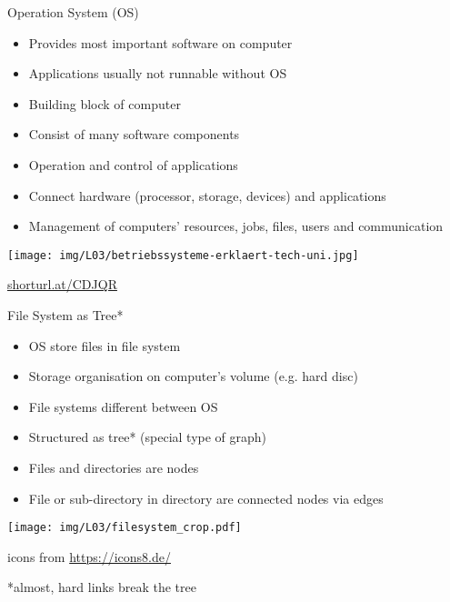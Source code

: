 \documentclass[hyperref={pdfpagelabels=false},aspectratio=169]{beamer}
\begin{document}
\begin{frame}{Operation System (OS)}
    
    \begin{itemize}
        \item Provides most important software on computer
        \item Applications usually not runnable without OS
        \item Building block of computer
        \item Consist of many software components
        \item Operation and control of applications
        \item Connect hardware (processor, storage, devices) and applications 
        \item Management of computers' resources, jobs, files, users and communication
    \end{itemize}
    
    \vspace{10pt}
    \centering
    \texttt{[image: img/L03/betriebssysteme-erklaert-tech-uni.jpg]}
    
    \tiny \url{shorturl.at/CDJQR}
    
\end{frame}

\begin{frame}{File System as Tree*}
    
    \begin{minipage}{0.59\textwidth}
        \begin{itemize}
            \item OS store files in file system
            \item Storage organisation on computer's volume (e.g. hard disc)
            \item File systems different between OS
            \item Structured as tree* (special type of graph)
            \item Files and directories are nodes
            \item File or sub-directory in directory are connected nodes via edges
        \end{itemize}
    \end{minipage}
    \begin{minipage}{0.4\textwidth}
        \centering
        \texttt{[image: img/L03/filesystem\_crop.pdf]}
        
        \tiny
        icons from \url{https://icons8.de/}
        
    \end{minipage}
    \tiny
    *almost, hard links break the tree
\end{frame}
\end{document}
